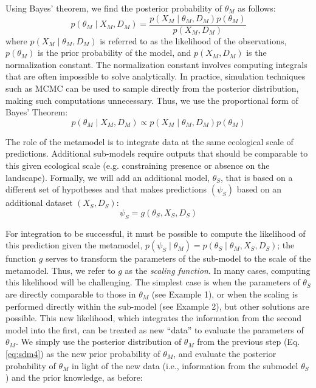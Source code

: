 \documentclass[11pt]{article}
\begin{document}
Using Bayes' theorem, we find the posterior probability of \(\theta_M\) as follows:
\begin{equation}
\label{eq:sdm3}
	p( \theta_M \mid X_M, D_M ) = \frac{ p( X_M \mid \theta_M, D_M ) p( \theta_M ) } { p(X_M, D_M) }
\end{equation}
where \(p( X_M \mid \theta_M, D_M )\) is referred to as the likelihood of the observations, \(p(\theta_M )\) is the prior probability of the model, and \(p(X_M, D_M)\) is the normalization constant.
The normalization constant involves computing integrals that are often impossible to solve analytically. 
In practice, simulation techniques such as \ac{MCMC} can be used to sample directly from the posterior distribution, making such computations unnecessary.
Thus, we use the proportional form of Bayes' Theorem:
\begin{equation}
\label{eq:sdm4}
	p( \theta_M \mid X_M, D_M ) \propto p( X_M \mid \theta_M, D_M ) p( \theta_M ) 
\end{equation}

The role of the metamodel is to integrate data at the same ecological scale of predictions.
Additional sub-models require outputs that should be comparable to this given ecological scale (e.g. constraining presence or absence on the landscape).
Formally, we will add an additional model, \(\theta_S\), that is based on a different set of hypotheses and that makes predictions \((\psi_S)\) based on an additional dataset \((X_S, D_S)\):
\begin{equation}
\label{eq:model2-1}
	\psi_S = g(\theta_S, X_S, D_S)
\end{equation}

For integration to be successful, it must be possible to compute the likelihood of this prediction given the metamodel, \(p \left( \psi_S \mid \theta_M \right) = p \left(\theta_S \mid \theta_M, X_S, D_S \right)\); the function \(g\) serves to transform the parameters of the sub-model to the scale of the metamodel. Thus, we refer to $g$ as the \emph{scaling function}. 
In many cases, computing this likelihood will be challenging.
The simplest case is when the parameters of \(\theta_S\) are directly comparable to those in \(\theta_M\) (see Example 1), or when the scaling is performed directly within the sub-model (see Example 2), but other solutions are possible.
This new likelihood, which integrates the information from the second model into the first, can be treated as new ``data'' to evaluate the parameters of \(\theta_M\).
We simply use the posterior distribution of $\theta_M$ from the previous step (Eq. \ref{eq:sdm4}) as the new prior probability of $\theta_M$, and evaluate the posterior probability of $\theta_M$ in light of the new data (i.e., information from the submodel \(\theta_S\)) and the prior knowledge, as before:
\end{document}
